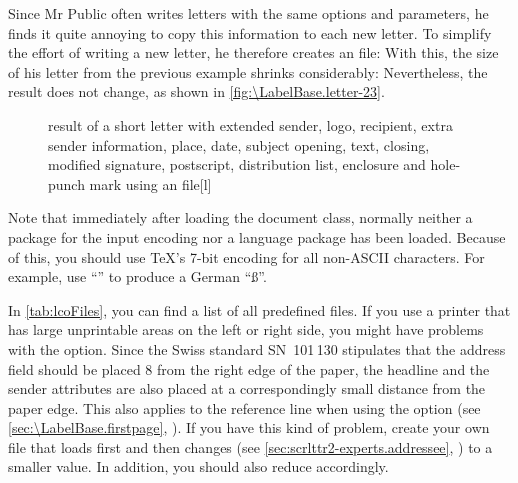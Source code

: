\begin{Example}
  Since Mr Public often writes letters with the same options and parameters,
  he finds it quite annoying to copy this information to each new letter. To
  simplify the effort of writing a new letter, he therefore creates an
   file:%
  With this, the size of his letter from the previous example shrinks
  considerably: %
  Nevertheless, the result does not change, as shown in
  \autoref{fig:\LabelBase.letter-23}.
  \begin{figure}
    \setcapindent{0pt}%
    \begin{captionbeside}
      {result of a short letter with extended sender, logo, recipient,
        extra sender information, place, date, subject opening, text,
        closing, modified signature, postscript, distribution list, enclosure
        and hole-punch mark using an  file}[l]
    \end{captionbeside}
    \label{fig:\LabelBase.letter-23}
  \end{figure}
\end{Example}

Note that immediately after loading the document class,
normally neither a package for the input encoding nor a language package has
been loaded. Because of this, you should use \TeX's 7-bit encoding for all
non-ASCII characters. For example, use ``'' to produce a German
``\ss''.

In \autoref{tab:lcoFiles},  you can find a list of
all predefined  files. If you use a printer
that has large unprintable areas on the left or right side, you might have
problems with the  option. Since the Swiss standard
SN~101\,130 stipulates that the address field should be placed 8 from
the right edge of the paper, the headline and the sender attributes are also
placed at a correspondingly small distance from the paper edge. This also
applies to the reference line when using the
 option (see
\autoref{sec:\LabelBase.firstpage}, ).
If you have this kind of problem, create your own 
file that loads  first and then changes
 (see
\autoref{sec:scrlttr2-experts.addressee},
) to a smaller value. In
addition, you should also reduce  accordingly.%

